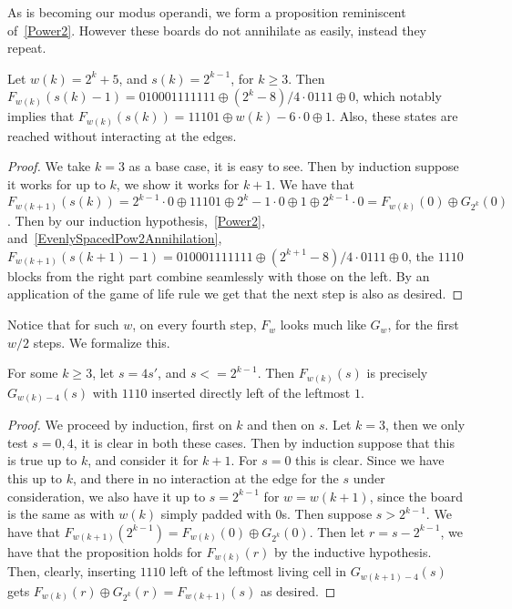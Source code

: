 \documentclass[12pt,letterpaper]{article}
\begin{document}
As is becoming our modus operandi, we form a proposition reminiscent of~\cref{Power2}. However these boards do not annihilate as easily, instead they repeat.
\begin{prop}\label{11101BoardsBig}
  Let $w(k)=2^k+5$, and $s(k)=2^{k-1}$, for $k\geq 3$. Then $F_{w(k)}(s(k)-1)=010001111111\oplus (2^k-8)/4\cdot 0111\oplus 0$, which notably implies that
  $F_{w(k)}(s(k))=11101\oplus w(k)-6\cdot 0\oplus 1$. Also, these states are reached without interacting at the edges.
\end{prop}
\begin{proof}
  We take $k=3$ as a base case, it is easy to see. Then by induction suppose it works for up to $k$, we show it works for $k+1$. We have that $F_{w(k+1)}(s(k))=2^{k-1}\cdot 0\oplus 11101\oplus 2^k-1\cdot 0\oplus 1\oplus 2^{k-1}\cdot 0 = F_{w(k)}(0)\oplus G_{2^k}(0)$. Then by our induction hypothesis,~\cref{Power2}, and~\cref{EvenlySpacedPow2Annihilation}, $F_{w(k+1)}(s(k+1)-1) = 010001111111\oplus (2^{k+1}-8)/4\cdot 0111\oplus 0$, the $1110$ blocks from the right part combine seamlessly with those on the left. By an application of the game of life rule we get that the next step is also as desired.
\end{proof}
Notice that for such $w$, on every fourth step, $F_w$ looks much like $G_w$, for the first $w/2$ steps. We formalize this.
\begin{cor}\label{11101LikeReg}
  For some $k\geq 3$, let $s=4s'$, and $s<=2^{k-1}$. Then $F_{w(k)}(s)$ is precisely $G_{w(k)-4}(s)$ with $1110$ inserted directly left of the leftmost $1$. 
\end{cor}
\begin{proof}
  We proceed by induction, first on $k$ and then on $s$. Let $k=3$, then we only test $s=0,4$, it is clear in both these cases. Then by induction suppose that this is true up to $k$, and consider it for $k+1$. For $s=0$ this is clear. %
  Since we have this up to $k$, and there in no interaction at the edge for the $s$ under consideration, we also have it up to $s=2^{k-1}$ for $w=w(k+1)$, since the board is the same as with $w(k)$ simply padded with 0s. Then suppose $s>2^{k-1}$. We have that $F_{w(k+1)}(2^{k-1})=F_{w(k)}(0)\oplus G_{2^k}(0)$. Then let $r=s-2^{k-1}$, we have that the proposition holds for $F_{w(k)}(r)$ by the inductive hypothesis. Then, clearly, inserting $1110$ left of the leftmost living cell in  $G_{w(k+1)-4}(s)$ gets $F_{w(k)}(r)\oplus G_{2^k}(r)=F_{w(k+1)}(s)$ as desired.
\end{proof}
\end{document}
